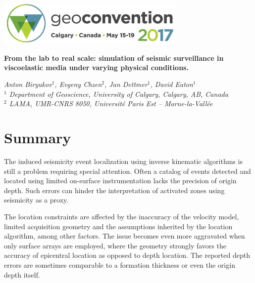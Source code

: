 \documentclass[letterpaper,11pt]{article}
\begin{document}

\begin{center}
\includegraphics[width=9.22cm]{header.png} \vspace{-1pt}
\end{center}

\begin{flushleft}
{\LARGE
\begin{spacing}{0.9}
\textbf{From the lab to real scale: simulation of seismic surveillance in viscoelastic media under varying physical conditions.}
\end{spacing}
}

\textit{Anton Biryukov${}^1$, Evgeny Chzen${}^2$, Jan Dettmer${}^1$, David Eaton${}^1$} \\
\textit{${}^1$ Department of Geoscience, University of Calgary, Calgary, AB, Canada} \\
\textit{${}^2$ LAMA, UMR-CNRS 8050, Universit\'{e} Paris Est -- Marne-la-Vall\'{e}e}
\end{flushleft}

\section*{Summary}
%
The induced seismicity event localization using inverse kinematic algorithms is still a problem requiring special attention. Often a catalog of events detected and located using limited on-surface instrumentation lacks the precision of origin depth. Such errors can hinder the interpretation of activated zones using seismicity as a proxy.

The location constraints are affected by the inaccuracy of the velocity model, limited acquisition geometry and the assumptions inherited by the location algorithm, among other factors. The issue becomes even more aggravated when only surface arrays are employed, where the geometry strongly favors the accuracy of epicentral location as opposed to depth location. The reported depth errors are sometimes comparable to a formation thickness or even the origin depth itself.
\end{document}
